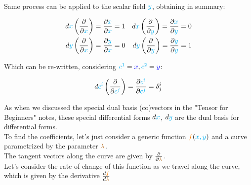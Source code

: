Same process can be applied to the scalar field $\color{cyan}y$, obtaining in summary:

\begin{align*}
    d\begingroup\color{cyan}x\endgroup \left(\frac{\partial}{\partial \begingroup\color{cyan}x\endgroup}\right) = \frac{\partial \begingroup\color{cyan}x\endgroup}{\partial \begingroup\color{cyan}x\endgroup} = 1 && 
    d\begingroup\color{cyan}x\endgroup \left(\frac{\partial}{\partial \begingroup\color{cyan}y\endgroup}\right) = \frac{\partial \begingroup\color{cyan}x\endgroup}{\partial \begingroup\color{cyan}y\endgroup} = 0\\
    d\begingroup\color{cyan}y\endgroup \left(\frac{\partial}{\partial \begingroup\color{cyan}x\endgroup}\right) = \frac{\partial \begingroup\color{cyan}y\endgroup}{\partial \begingroup\color{cyan}x\endgroup} = 0 && 
    d\begingroup\color{cyan}y\endgroup \left(\frac{\partial}{\partial \begingroup\color{cyan}y\endgroup}\right) = \frac{\partial \begingroup\color{cyan}y\endgroup}{\partial \begingroup\color{cyan}y\endgroup} = 1
\end{align*}

Which can be re-written, considering $\begingroup\color{cyan}c^1\endgroup = \begingroup\color{blue}x\endgroup, \begingroup\color{cyan}c^2\endgroup = \begingroup\color{blue}y\endgroup$:

\begin{equation}
    d\begingroup\color{cyan}c^i\endgroup \left(\frac{\partial}{\partial \begingroup\color{cyan}c^j\endgroup}\right) = \frac{\partial \begingroup\color{cyan}c^i\endgroup}{\partial \begingroup\color{cyan}c^j\endgroup} = \delta^i_j
\end{equation}

As when we discussed the special dual basis (co)vectors in the "Tensor for Beginners" notes, these special differential forms $d\color{cyan}x$, $d\color{cyan}y$ are the
dual basis for differential forms.\\
To find the coefficients, let's just consider a generic function $\begingroup\color{orange}f\endgroup (\begingroup\color{cyan}x, y\endgroup)$ and a curve parametrized by the parameter $\color{brown}\lambda$.\\
The tangent vectors along the curve are given by $\frac{\partial}{\partial \color{brown}\lambda}$.\\
Let's consider the rate of change of this function as we travel along the curve, which is given by the derivative $\frac{d \begingroup\color{orange}f\endgroup}{d \begingroup\color{brown}\lambda\endgroup}$\\


